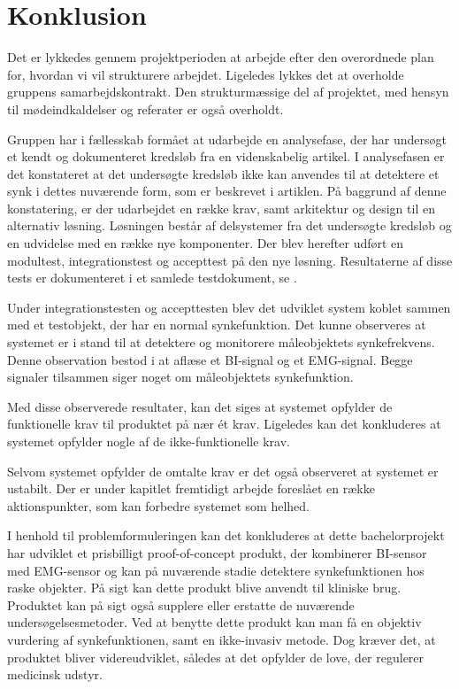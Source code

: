 \chapter{Konklusion}

Det er lykkedes gennem projektperioden at arbejde efter den overordnede plan for, hvordan vi vil strukturere arbejdet.  Ligeledes lykkes det at overholde gruppens samarbejdskontrakt. Den strukturmæssige del af projektet, med hensyn til mødeindkaldelser og referater er også overholdt. 

Gruppen har i fællesskab formået at udarbejde en analysefase, der har undersøgt et kendt og dokumenteret kredsløb fra en videnskabelig artikel. I analysefasen er det konstateret at det undersøgte kredsløb ikke kan anvendes til at detektere et synk i dettes nuværende form, som er beskrevet i artiklen. På baggrund af denne konstatering, er der udarbejdet en række krav, samt arkitektur og design til en alternativ løsning. Løsningen består af delsystemer fra det undersøgte kredsløb og en udvidelse med en række nye komponenter.  Der blev herefter udført en modultest, integrationstest og accepttest på den nye løsning. Resultaterne af disse tests er dokumenteret i et samlede testdokument, se .
 
Under integrationstesten og accepttesten blev det udviklet system koblet sammen med et testobjekt, der har en normal synkefunktion.  Det kunne observeres at systemet er i stand til at detektere og monitorere måleobjektets synkefrekvens.  Denne observation bestod i at aflæse et BI-signal og et EMG-signal. Begge signaler tilsammen siger noget om måleobjektets synkefunktion. 

Med disse observerede resultater, kan det siges at systemet opfylder de funktionelle krav til produktet på nær ét krav. Ligeledes kan det konkluderes at systemet opfylder nogle af de ikke-funktionelle krav. 

Selvom systemet opfylder de omtalte krav er det også observeret at systemet er ustabilt. Der er under kapitlet fremtidigt arbejde foreslået en række aktionspunkter, som kan forbedre systemet som helhed.

I henhold til problemformuleringen kan det konkluderes at dette bachelorprojekt har udviklet et prisbilligt proof-of-concept produkt, der kombinerer BI-sensor med EMG-sensor og kan på nuværende stadie detektere synkefunktionen hos raske objekter. På sigt kan dette produkt blive anvendt til kliniske brug. Produktet kan på sigt også supplere eller erstatte de nuværende undersøgelsesmetoder. Ved at benytte dette produkt kan man få en objektiv  vurdering af synkefunktionen, samt en ikke-invasiv metode. Dog kræver det, at produktet bliver videreudviklet, således at det opfylder de love, der regulerer medicinsk udstyr.  








